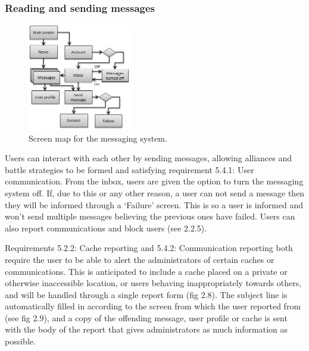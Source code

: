 \subsubsection{Reading and sending messages}

\begin{figure}
	\vspace{-20pt}
	\begin{center}
	\includegraphics[width=0.4\textwidth]{images/sending_messages}
	\caption{Screen map for the messaging system.}
	\label{sending_messages}
	\end{center}
	\vspace{-20pt}
\end{figure}

Users can interact with each other by sending messages, allowing alliances and battle strategies to be formed and satisfying requirement 5.4.1: User communication. From the inbox, users are given the option to turn the messaging system off. If, due to this or any other reason, a user can not send a message then they will be informed through a `Failure' screen. This is so a user is informed and won't send multiple messages believing the previous ones have failed. Users can also report communications and block users (see 2.2.5).

Requirements 5.2.2: Cache reporting and 5.4.2: Communication reporting both require the user to be able to alert the administrators of certain caches or communications. This is anticipated to include a cache placed on a private or otherwise inaccessible location, or users behaving inappropriately towards others, and will be handled through a single report form (fig 2.8). The subject line is automatically filled in according to the screen from which the user reported from (see fig 2.9), and a copy of the offending message, user profile or cache is sent with the body of the report that gives administrators as much information as possible.

